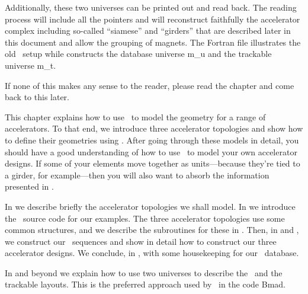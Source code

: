 {{{Additionally, these two universes can be printed out and read
back. The reading process will include all the pointers and will
reconstruct faithfully the accelerator complex including so-called
``siamese'' and ``girders'' that are described later in this document
and allow the grouping of magnets. The Fortran file
 illustrates the old \DNA\ setup while
 constructs the database universe m_u and
the trackable universe m_t.
 
If none of this makes any sense to the reader, please read the chapter
and come back to this later. } }}

This chapter explains how to use \PTC\ to model the geometry for a
range of accelerators. To that end, we introduce three accelerator
topologies and show how to define their geometries using \PTC. After
going through these models in detail, you should have a good
understanding of how to use \PTC\ to model your own accelerator
designs. If some of your elements move together as units---because
they're tied to a girder, for example---then you will also want to
absorb the information presented in .

In  we describe briefly the accelerator topologies
we shall model. In  we introduce the \PTC\ source code
for our examples. The three accelerator topologies use some common
structures, and we describe the subroutines for these in
. Then, in  and ,
we construct our \DNA\ sequences and show in detail how to construct
our three accelerator designs. We conclude, in , with
some housekeeping
for our \DNA\ database.

In  and beyond we explain how to use two universes to describe the \DNA\ and the trackable layouts. This is the preferred approach used by  \PTC\ in the code Bmad.





